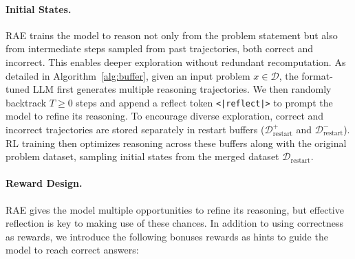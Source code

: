 \paragraph{Initial States.}
RAE trains the model to reason not only from the problem statement but also from intermediate steps sampled from past trajectories, both correct and incorrect. This enables deeper exploration without redundant recomputation. 
As detailed in Algorithm~\ref{alg:buffer}, given an input problem \( x \in \mathcal{D} \), the format-tuned LLM first generates multiple reasoning trajectories. We then randomly backtrack \( T \geq 0 \) steps and append a reflect token \texttt{<|reflect|>} to prompt the model to refine its reasoning. To encourage diverse exploration, correct and incorrect trajectories are stored separately in restart buffers (\(\mathcal{D}^+_{\text{restart}}\) and \(\mathcal{D}^-_{\text{restart}}\)). RL training then optimizes reasoning across these buffers along with the original problem dataset, sampling initial states from the merged dataset $\mathcal{D}_{\text{restart}}$.


\paragraph{Reward Design.} RAE gives the model multiple opportunities to refine its reasoning, but effective reflection is key to making use of these chances. In addition to using correctness as rewards, we introduce the following bonuses rewards as hints to guide the model to reach correct answers:

